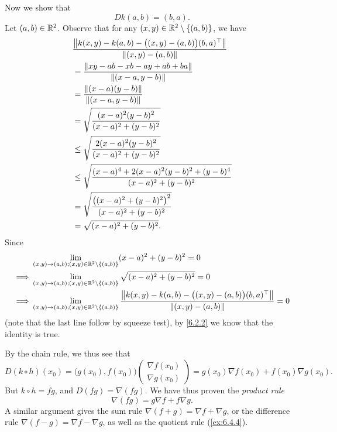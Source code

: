 \begin{eg}
  Now we show that
  \[
    D k(a, b) = (b, a).
  \]
  Let \((a, b) \in \R^2\).
  Observe that for any \((x, y) \in \R^2 \setminus \set{(a, b)}\), we have
  \begin{align*}
     & \dfrac{\norm*{k(x, y) - k(a, b) - \big((x, y) - (a, b)\big) (b, a)^\top}}{\norm*{(x, y) - (a, b)}} \\
     & = \dfrac{\norm*{xy - ab - xb - ay + ab + ba}}{\norm*{(x - a, y - b)}}                              \\
     & = \dfrac{\norm*{(x - a)(y - b)}}{\norm*{(x - a, y - b)}}                                           \\
     & = \sqrt{\dfrac{(x - a)^2 (y - b)^2}{(x - a)^2 + (y - b)^2}}                                        \\
     & \leq \sqrt{\dfrac{2 (x - a)^2 (y - b)^2}{(x - a)^2 + (y - b)^2}}                                   \\
     & \leq \sqrt{\dfrac{(x - a)^4 + 2 (x - a)^2 (y - b)^2 + (y - b)^4}{(x - a)^2 + (y - b)^2}}           \\
     & = \sqrt{\dfrac{\big((x - a)^2 + (y - b)^2\big)^2}{(x - a)^2 + (y - b)^2}}                          \\
     & = \sqrt{(x - a)^2 + (y - b)^2}.
  \end{align*}
  Since
  \begin{align*}
             & \lim_{(x, y) \to (a, b) ; (x, y) \in \R^2 \setminus \set{(a, b)}} (x - a)^2 + (y - b)^2 = 0                                                                              \\
    \implies & \lim_{(x, y) \to (a, b) ; (x, y) \in \R^2 \setminus \set{(a, b)}} \sqrt{(x - a)^2 + (y - b)^2} = 0                                                                       \\
    \implies & \lim_{(x, y) \to (a, b) ; (x, y) \in \R^2 \setminus \set{(a, b)}} \dfrac{\norm*{k(x, y) - k(a, b) - \big((x, y) - (a, b)\big) (b, a)^\top}}{\norm*{(x, y) - (a, b)}} = 0
  \end{align*}
  (note that the last line follow by squeeze test),
  by \cref{6.2.2} we know that the identity is true.

  By the chain rule, we thus see that
  \[
    D (k \circ h)(x_0) = \big(g(x_0), f(x_0)\big) \begin{pmatrix}
      \nabla f(x_0) \\
      \nabla g(x_0)
    \end{pmatrix} = g(x_0) \nabla f(x_0) + f(x_0) \nabla g(x_0).
  \]
  But \(k \circ h = fg\), and \(D (fg) = \nabla (fg)\).
  We have thus proven the \emph{product rule}
  \[
    \nabla (fg) = g \nabla f + f \nabla g.
  \]
  A similar argument gives the sum rule \(\nabla (f + g) = \nabla f + \nabla g\), or the difference rule \(\nabla (f - g) = \nabla f - \nabla g\), as well as the quotient rule (\cref{ex:6.4.4}).
\end{eg}

